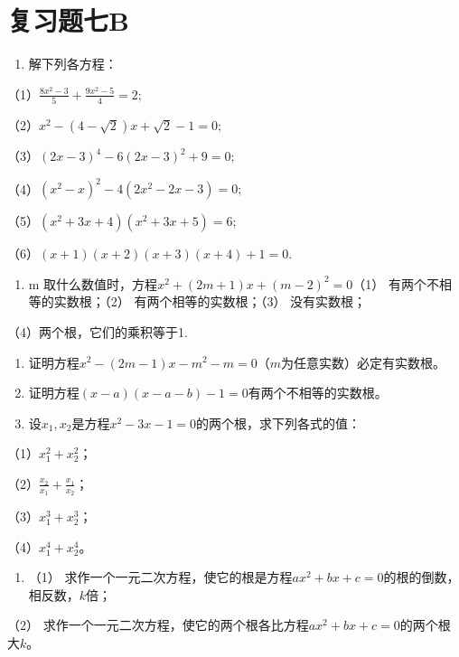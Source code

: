 \section{复习题七B}

\begin{enumerate}
\item
  解下列各方程：
\end{enumerate}

（1）\(\frac{8x^2 - 3}{5} + \frac{9x^2 - 5}{4} = 2;\)

（2）\(x^{2} - (4 - \sqrt{2})x + \sqrt{2} - 1 = 0;\)

（3）\((2x - 3)^{4} - 6(2x - 3)^{2} + 9 = 0;\)

（4）\((x^{2} - x)^{2} - 4(2x^{2} - 2x - 3) = 0;\)

（5）\((x^{2} + 3x + 4)(x^{2} + 3x + 5) = 6;\)

（6）\((x + 1)(x + 2)(x + 3)(x + 4) + 1 = 0.\)

\begin{enumerate}[start=2]
\item
  m 取什么数值时，方程\(x^{2}+(2m+1)x+(m-2)^{2}=0\)（1）
  有两个不相等的实数根；（2） 有两个相等的实数根；（3） 没有实数根；
\end{enumerate}

（4）两个根，它们的乘积等于1.

\begin{enumerate}[start=3]
\item
  证明方程\(x^{2} - (2m - 1)x - m^{2} - m = 0\)（\(m\)为任意实数）必定有实数根。
\item
  证明方程\((x - a)(x - a - b) - 1 = 0\)有两个不相等的实数根。
\item
  设\(x_{1}, x_{2}\)是方程\(x^{2} - 3x - 1 = 0\)的两个根，求下列各式的值：
\end{enumerate}

（1）\(x_{1}^{2} + x_{2}^{2}\)；

（2）\(\frac{x_2}{x_1} + \frac{x_1}{x_2}\)；

（3）\(x_{1}^{3} + x_{2}^{3}\)；

（4）\(x_{1}^{4} + x_{2}^{4}\)。

\begin{enumerate}[start=6]
\item
  （1）
  求作一个一元二次方程，使它的根是方程\(ax^2 + bx + c = 0\)的根的倒数，相反数，\(k\)倍；
\end{enumerate}

（2）
求作一个一元二次方程，使它的两个根各比方程\(ax^2 + bx + c = 0\)的两个根大\(k\)。

